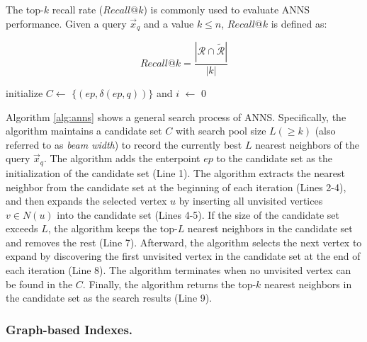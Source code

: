 \documentclass[acmsmall]{acmart}
\theoremstyle{remark}
\theoremstyle{definition}
\begin{document}
The top-$k$ recall rate ($Recall@k$) is commonly used to evaluate ANNS performance. Given a query $\vec{x}_q$ and a value $k \le n$, $Recall@k$ is defined as:\vspace{-2ex}

\begin{equation}
	Recall@k = \frac{| \mathcal{R} \cap \tilde{ \mathcal{R} } |}{|k|}
\end{equation}

\begin{algorithm}[t]\small
	\DontPrintSemicolon
	initialize $C \gets$ $\{(ep, \delta(ep, q))\}$ and $i$ $\gets$ 0\;
	\;
	\caption{KNNSearch($q$, $G$, $L$, $k$, $ep$)}
	\label{alg:anns}
\end{algorithm}

Algorithm \ref{alg:anns} shows a general search process of ANNS. Specifically, the algorithm maintains a candidate set $C$ with search pool size $L (\ge k)$ (also referred to as \textit{beam width}) to record the currently best $L$ nearest neighbors of the query $\vec{x}_q$. The algorithm adds the enterpoint $ep$ to the candidate set as the initialization of the candidate set (Line 1). The algorithm extracts the nearest neighbor from the candidate set at the beginning of each iteration (Lines 2-4), and then expands the selected vertex $u$ by inserting all unvisited vertices $v \in N(u)$ into the candidate set (Lines 4-5). If the size of the candidate set exceeds $L$, the algorithm keeps the top-$L$ nearest neighbors in the candidate set and removes the rest (Line 7). Afterward, the algorithm selects the next vertex to expand by discovering the first unvisited vertex in the candidate set at the end of each iteration (Line 8). The algorithm terminates when no unvisited vertex can be found in the $C$. Finally, the algorithm returns the top-$k$ nearest neighbors in the candidate set as the search results (Line 9).

\subsubsection{Graph-based Indexes.}
\label{subsubsec:graphBasedIndex}
\end{document}
